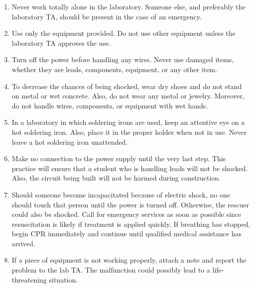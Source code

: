 \begin{enumerate}
	\item Never work totally alone in the laboratory. Someone else, and preferably the laboratory TA, should be present in the case of an emergency.
	\item Use only the equipment provided. Do not use other equipment unless the laboratory TA approves the use.
	\item Turn off the power before handling any wires. Never use damaged items, whether they are leads, components, equipment, or any other item.
	\item To decrease the chances of being shocked, wear dry shoes and do not stand on metal or wet concrete. Also, do not wear any metal or jewelry. Moreover, do not handle wires, components,
or equipment with wet hands.
	\item In a laboratory in which soldering irons are used, keep an attentive eye on a hot soldering iron. Also, place it in the proper holder when not in use. Never leave a hot soldering iron
unattended.
	\item Make no connection to the power supply until the very last step. This practice will ensure that a student who is handling leads will not be shocked. Also, the circuit being built will not be harmed during construction.
	\item Should someone become incapacitated because of electric shock, no one should touch that person until the power is turned off. Otherwise, the rescuer could also be shocked. Call for emergency services as soon as possible since resuscitation is likely if treatment is applied quickly. If breathing has stopped, begin CPR immediately and continue until qualified medical assistance has arrived.
	\item If a piece of equipment is not working properly, attach a note and report the problem to the lab TA. The malfunction could possibly lead to a life-threatening situation.
\end{enumerate}
